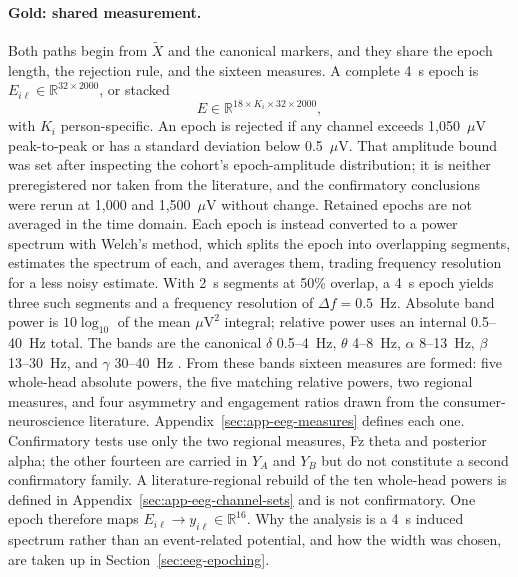 \documentclass[english]{article}
\begin{document}
\paragraph{Gold: shared measurement.}
Both paths begin from \(\tilde{X}\) and the canonical markers, and they share the epoch length, the rejection rule, and the sixteen measures. A complete 4~s epoch is \(E_{i\ell}\in\mathbb{R}^{32\times 2000}\), or stacked
\begin{equation}
E\in\mathbb{R}^{18\times K_i\times 32\times 2000},
\end{equation}
with \(K_i\) person-specific. An epoch is rejected if any channel exceeds 1{,}050~$\mu$V peak-to-peak or has a standard deviation below 0.5~$\mu$V. That amplitude bound was set after inspecting the cohort's epoch-amplitude distribution; it is neither preregistered nor taken from the literature, and the confirmatory conclusions were rerun at 1{,}000 and 1{,}500~$\mu$V without change. Retained epochs are not averaged in the time domain. Each epoch is instead converted to a power spectrum with Welch's method, which splits the epoch into overlapping segments, estimates the spectrum of each, and averages them, trading frequency resolution for a less noisy estimate. With 2~s segments at 50\% overlap, a 4~s epoch yields three such segments and a frequency resolution of \(\Delta f=0.5\)~Hz. Absolute band power is \(10\log_{10}\) of the mean \(\mu\mathrm{V}^{2}\) integral; relative power uses an internal 0.5--40~Hz total. The bands are the canonical \(\delta\) 0.5--4~Hz, \(\theta\) 4--8~Hz, \(\alpha\) 8--13~Hz, \(\beta\) 13--30~Hz, and \(\gamma\) 30--40~Hz \cite{cochran1967fast,zheng2015investigating}. From these bands sixteen measures are formed: five whole-head absolute powers, the five matching relative powers, two regional measures, and four asymmetry and engagement ratios drawn from the consumer-neuroscience literature. Appendix~\ref{sec:app-eeg-measures} defines each one. Confirmatory tests use only the two regional measures, Fz theta and posterior alpha; the other fourteen are carried in \(Y_A\) and \(Y_B\) but do not constitute a second confirmatory family. A literature-regional rebuild of the ten whole-head powers is defined in Appendix~\ref{sec:app-eeg-channel-sets} and is not confirmatory. One epoch therefore maps \(E_{i\ell}\to y_{i\ell}\in\mathbb{R}^{16}\). Why the analysis is a 4~s induced spectrum rather than an event-related potential, and how the width was chosen, are taken up in Section~\ref{sec:eeg-epoching}.
\end{document}
